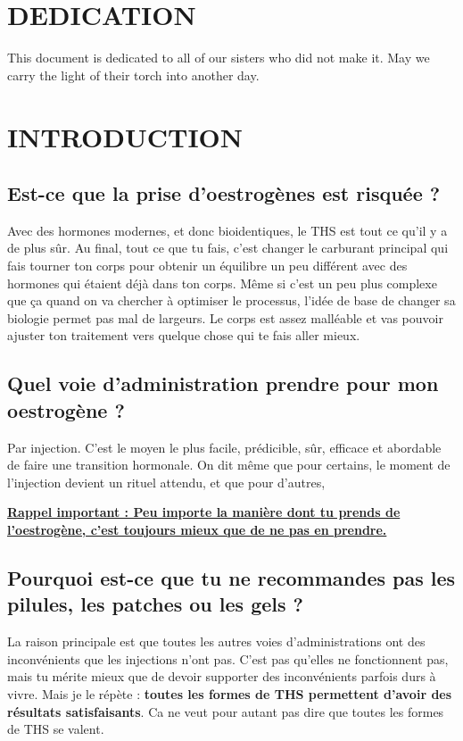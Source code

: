 \documentclass{article}
\begin{document}
\section*{DEDICATION}

This document is dedicated to all of our sisters who did not make it. May we carry the light of their torch into another day.

 

\section{INTRODUCTION}

\subsection{Est-ce que la prise d'oestrogènes est risquée ?}

Avec des hormones modernes, et donc bioidentiques, le THS est tout ce qu'il y a de plus sûr. Au final, tout ce que tu fais, c'est changer le carburant principal qui fais tourner ton corps pour obtenir un équilibre un peu différent avec des hormones qui étaient déjà dans ton corps. Même si c'est un peu plus complexe que ça quand on va chercher à optimiser le processus, l'idée de base de changer sa biologie permet pas mal de largeurs. Le corps est assez malléable et vas pouvoir ajuster ton traitement vers quelque chose qui te fais aller mieux.

\subsection{Quel voie d'administration prendre pour mon oestrogène ?}

Par injection. C'est le moyen le plus facile, prédicible, sûr, efficace et abordable de faire une transition hormonale. On dit même que pour certains, le moment de l'injection devient un rituel attendu, et que pour d'autres,  

\noindent\underline{\textbf{Rappel important : Peu importe la manière dont tu prends de l'oestrogène, c'est toujours mieux que de ne pas en prendre.}}

\subsection{Pourquoi est-ce que tu ne recommandes pas les pilules, les patches ou les gels ?}

La raison principale est que toutes les autres voies d'administrations ont des inconvénients que les injections n'ont pas. C'est pas qu'elles ne fonctionnent pas, mais tu mérite mieux que de devoir supporter des inconvénients parfois durs à vivre. Mais je le répète : \textbf{toutes les formes de THS permettent d'avoir des résultats satisfaisants}. Ca ne veut pour autant pas dire que toutes les formes de THS se valent.
\end{document}
